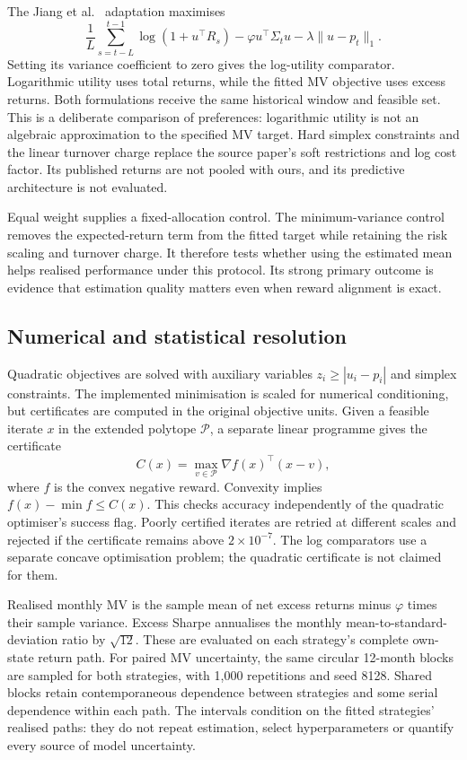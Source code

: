 \documentclass[sigconf,review]{acmart}
\begin{document}
The Jiang et al.\ \cite{jiang2025} adaptation maximises
\begin{equation}
 \frac1L\sum_{s=t-L}^{t-1}\log(1+u^\top R_s)
 -\varphi u^\top\Sigma_tu-\lambda\|u-p_t\|_1.
\end{equation}
Setting its variance coefficient to zero gives the log-utility comparator. Logarithmic utility uses total returns, while the fitted MV objective uses excess returns. Both formulations receive the same historical window and feasible set. This is a deliberate comparison of preferences: logarithmic utility is not an algebraic approximation to the specified MV target. Hard simplex constraints and the linear turnover charge replace the source paper's soft restrictions and log cost factor. Its published returns are not pooled with ours, and its predictive architecture is not evaluated.

Equal weight supplies a fixed-allocation control. The minimum-variance control removes the expected-return term from the fitted target while retaining the risk scaling and turnover charge. It therefore tests whether using the estimated mean helps realised performance under this protocol. Its strong primary outcome is evidence that estimation quality matters even when reward alignment is exact.

\subsection{Numerical and statistical resolution}
Quadratic objectives are solved with auxiliary variables $z_i\ge |u_i-p_i|$ and simplex constraints. The implemented minimisation is scaled for numerical conditioning, but certificates are computed in the original objective units. Given a feasible iterate $x$ in the extended polytope $\mathcal P$, a separate linear programme gives the certificate
\begin{equation}
 C(x)=\max_{v\in\mathcal P}\nabla f(x)^\top(x-v),
\end{equation}
where $f$ is the convex negative reward. Convexity implies $f(x)-\min f\le C(x)$. This checks accuracy independently of the quadratic optimiser's success flag. Poorly certified iterates are retried at different scales and rejected if the certificate remains above $2\times10^{-7}$. The log comparators use a separate concave optimisation problem; the quadratic certificate is not claimed for them.

Realised monthly MV is the sample mean of net excess returns minus $\varphi$ times their sample variance. Excess Sharpe annualises the monthly mean-to-standard-deviation ratio by $\sqrt{12}$. These are evaluated on each strategy's complete own-state return path. For paired MV uncertainty, the same circular 12-month blocks are sampled for both strategies, with 1,000 repetitions and seed 8128. Shared blocks retain contemporaneous dependence between strategies and some serial dependence within each path. The intervals condition on the fitted strategies' realised paths: they do not repeat estimation, select hyperparameters or quantify every source of model uncertainty.
\end{document}
